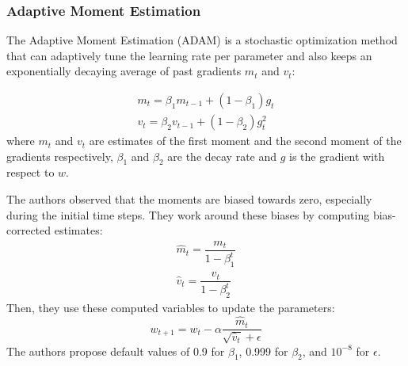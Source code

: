 \subsubsection{Adaptive Moment Estimation}
The Adaptive Moment Estimation (ADAM) \cite{kingma2014adam} is a stochastic optimization method that can adaptively tune the learning rate per parameter and also keeps an exponentially decaying average of past gradients $m_t$ and $v_t$:

\begin{subequations}
\begin{gather}
\label{adamfirst}
m_t = \beta_1 m_{t-1} + (1 - \beta_1) g_t \\   
v_t = \beta_2 v_{t-1} + (1 - \beta_2) g_t^2  
\end{gather}
\end{subequations}
where $m_t$ and $v_t$ are estimates of the first moment and the second moment of the gradients respectively, $\beta_1$ and $\beta_2$ are the decay rate and $g$ is the gradient with respect to $w$. 

The authors observed that the moments are biased towards zero, especially during the initial time steps. They work around these biases by computing bias-corrected estimates:
\begin{subequations}
\begin{gather}
\hat{m}_t=\dfrac{m_t}{1 - \beta^t_1} \\
\hat{v}_t=\dfrac{v_t}{1 - \beta^t_2}
\label{adamend}
\end{gather}
\end{subequations}
Then, they use these computed variables to update the parameters:
\begin{equation}
w_{t+1} = w_{t} - \alpha \dfrac{\hat{m}_t}{\sqrt{\hat{v}_t} + \epsilon} 
\label{adamend2}
\end{equation}
The authors propose default values of 0.9 for $\beta_1$, 0.999 for $\beta_2$, and $10^{-8}$ for $\epsilon$.


